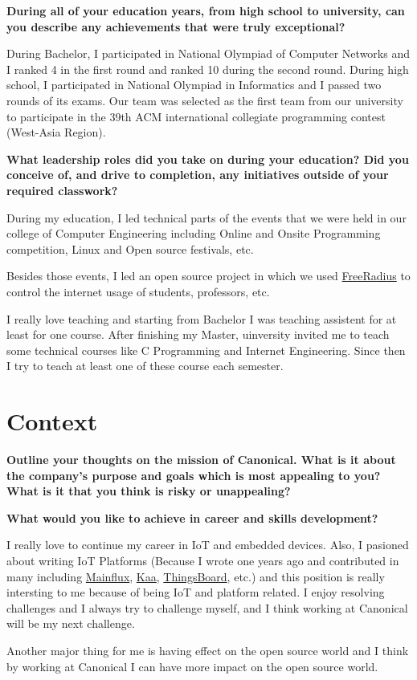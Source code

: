 \noindent
\textbf{During all of your education years, from high school to university, can you describe any achievements that were truly exceptional?}

During Bachelor, I participated in National Olympiad of Computer Networks and I ranked 4 in the first round and ranked
10 during the second round.
During high school, I participated in National Olympiad in Informatics and I passed two rounds of its exams.
Our team was selected as the first team from our university to participate in the 39th ACM international collegiate
programming contest (West-Asia Region).

\noindent
\textbf{What leadership roles did you take on during your education?
Did you conceive of, and drive to completion, any initiatives outside of your required classwork?}

During my education, I led technical parts of the events that we were held in our college of Computer Engineering including
Online and Onsite Programming competition, Linux and Open source festivals, etc.

Besides those events, I led an open source project in which we used \href{https://freeradius.org/}{FreeRadius}
to control the internet usage of students, professors, etc.

I really love teaching and starting from Bachelor I was teaching assistent for at least for one course.
After finishing my Master, uinversity invited me to teach some technical courses like C Programming and
Internet Engineering. Since then I try to teach at least one of these course each semester.

\section{Context}

\noindent
\textbf{Outline your thoughts on the mission of Canonical. What is it about the company's purpose and goals which is most appealing to you?
What is it that you think is risky or unappealing?}

\noindent
\textbf{What would you like to achieve in career and skills development?}

I really love to continue my career in IoT and embedded devices. Also, I pasioned about writing IoT Platforms
(Because I wrote one years ago and contributed in many including \href{https://github.com/mainflux}{Mainflux},
\href{https://github.com/kaaproject}{Kaa}, \href{https://github.com/thingsboard}{ThingsBoard}, etc.)
and this position is really intersting to me because of being IoT and platform related.
I enjoy resolving challenges and I always try to challenge myself, and I think working at Canonical will be my next challenge.

Another major thing for me is having effect on the open source world and I think by working at Canonical I can
have more impact on the open source world.
